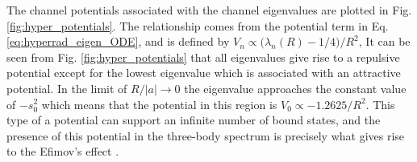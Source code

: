 \documentclass[prl,onecolumn,amsmath,amssymb,titlepage,nofootinbib,preprint]{revtex4-1}
\begin{document}
	The channel potentials associated with the channel eigenvalues are plotted in Fig. \ref{fig:hyper_potentials}.  The relationship comes from the potential term in Eq. \ref{eq:hyperrad_eigen_ODE}, and is defined by $V_{n}\propto\big(\lambda_{n}(R)-1/4\big)/R^{2}$, It can be seen from Fig. \ref{fig:hyper_potentials} that all eigenvalues give rise to a repulsive potential except for the lowest eigenvalue which is associated with an attractive potential.  In the limit of $R/|a|\rightarrow0$ the eigenvalue approaches the constant value of $-s_{0}^{2}$ which means that the potential in this region is $V_{0}\propto-1.2625/R^{2}$.  This type of a potential can support an infinite number of bound states, and the presence of this potential in the three-body spectrum is precisely what gives rise to the Efimov's effect \cite{Efimov1970}\cite{Efimov1971}.
\end{document}
